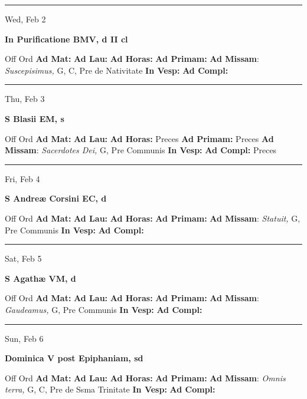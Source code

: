\documentclass[letterpaper, 10pt]{article}
\begin{document}
\hrule
\begin{center}
Wed, Feb 2
\end{center}\textbf{ \large In Purificatione BMV, \textnormal{\normalsize d II cl}}
\begin{justify}
Off Ord
\textbf{Ad Mat: }
\textbf{Ad Lau: }
\textbf{Ad Horas: }
\textbf{Ad Primam: }
\textbf{Ad Missam}: \textit{Suscepisimus,} G, C, Pre de Nativitate
\textbf{In Vesp: }
\textbf{Ad Compl: }\end{justify}



\hrule
\begin{center}
Thu, Feb 3
\end{center}\textbf{ \large S Blasii EM, \textnormal{\normalsize s}}
\begin{justify}
Off Ord
\textbf{Ad Mat: }
\textbf{Ad Lau: }
\textbf{Ad Horas: }Preces
\textbf{Ad Primam: }Preces
\textbf{Ad Missam}: \textit{Sacerdotes Dei,} G, Pre Communis
\textbf{In Vesp: }
\textbf{Ad Compl: }Preces\end{justify}



\hrule
\begin{center}
Fri, Feb 4
\end{center}\textbf{ \large S Andreæ Corsini EC, \textnormal{\normalsize d}}
\begin{justify}
Off Ord
\textbf{Ad Mat: }
\textbf{Ad Lau: }
\textbf{Ad Horas: }
\textbf{Ad Primam: }
\textbf{Ad Missam}: \textit{Statuit,} G, Pre Communis
\textbf{In Vesp: }
\textbf{Ad Compl: }\end{justify}



\hrule
\begin{center}
Sat, Feb 5
\end{center}\textbf{ \large S Agathæ VM, \textnormal{\normalsize d}}
\begin{justify}
Off Ord
\textbf{Ad Mat: }
\textbf{Ad Lau: }
\textbf{Ad Horas: }
\textbf{Ad Primam: }
\textbf{Ad Missam}: \textit{Gaudeamus,} G, Pre Communis
\textbf{In Vesp: }
\textbf{Ad Compl: }\end{justify}



\hrule
\begin{center}
Sun, Feb 6
\end{center}\textbf{ \large Dominica V post Epiphaniam, \textnormal{\normalsize sd}}
\begin{justify}
Off Ord
\textbf{Ad Mat: }
\textbf{Ad Lau: }
\textbf{Ad Horas: }
\textbf{Ad Primam: }
\textbf{Ad Missam}: \textit{Omnis terra,} G, C, Pre de Ssma Trinitate
\textbf{In Vesp: }
\textbf{Ad Compl: }\end{justify}
\end{document}
